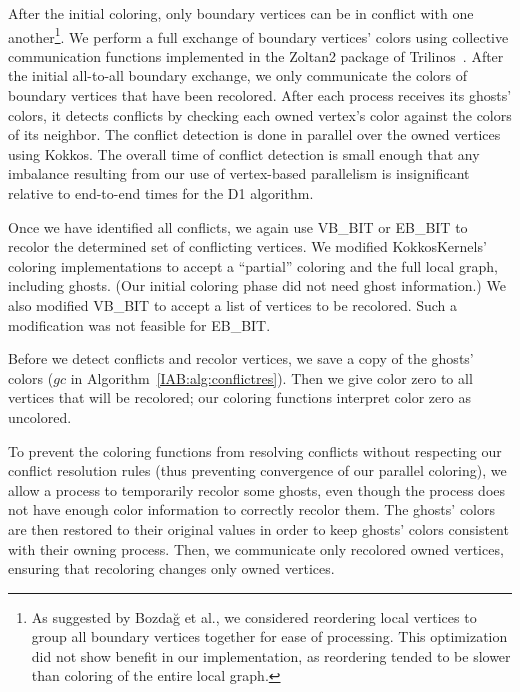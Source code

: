 After the initial coloring, only boundary vertices can be in conflict with one another\footnote{As suggested by Bozda{\u{g}} et al., we considered reordering local vertices to group all boundary vertices together for ease of processing. This optimization did not show benefit in our implementation, as reordering tended to be slower than coloring of the entire local graph.}.
We perform a full exchange of boundary vertices' colors using collective communication functions implemented in the Zoltan2 package of Trilinos~\cite{IAB:heroux2005overview}.
After the initial all-to-all boundary exchange, we only communicate the colors of boundary vertices that have been recolored.
After each process receives its ghosts' colors, it detects conflicts by checking each owned vertex's color against the colors of its neighbor.
The conflict detection is done in parallel over the owned vertices using Kokkos.
The overall time of conflict detection is small enough that any imbalance resulting from our use of vertex-based parallelism is insignificant relative to end-to-end times for the D1 algorithm. 




Once we have identified all conflicts, we again use VB\_BIT or EB\_BIT to recolor the determined set of conflicting vertices. 
We modified KokkosKernels' coloring implementations to accept a ``partial'' coloring and the full local graph, including ghosts. 
(Our initial coloring phase did not need ghost information.)
We also modified VB\_BIT to accept a list of vertices to be recolored. 
Such a modification was not feasible for EB\_BIT.

Before we detect conflicts and recolor vertices, we save a copy of the ghosts' colors ($\mathit{gc}$ in Algorithm~\ref{IAB:alg:conflictres}).
Then we give color zero to all vertices that will be recolored; our coloring functions interpret color zero as uncolored.

To prevent the coloring functions from resolving conflicts without respecting our conflict resolution rules (thus preventing convergence of our parallel coloring), we allow a process to temporarily recolor some ghosts,
even though the process does not have enough color information to correctly recolor them.  The ghosts' colors are then 
restored to their original values in order to keep ghosts' colors consistent with their owning process.
Then, we communicate only recolored owned vertices, ensuring that recoloring changes only owned vertices.

